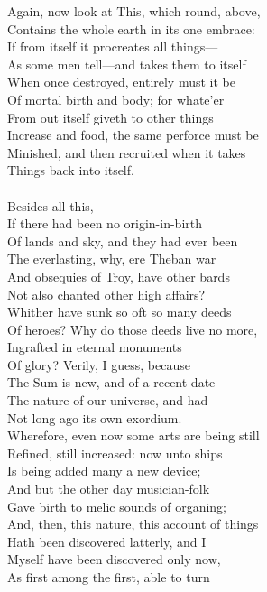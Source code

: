 Again, now look at This, which round, above,\\
Contains the whole earth in its one embrace:\\
If from itself it procreates all things—\\
As some men tell—and takes them to itself\\
When once destroyed, entirely must it be\\
Of mortal birth and body; for whate'er\\
From out itself giveth to other things\\
Increase and food, the same perforce must be\\
Minished, and then recruited when it takes\\
Things back into itself.\\
\\
Besides all this,\\
If there had been no origin-in-birth\\
Of lands and sky, and they had ever been\\
The everlasting, why, ere Theban war\\
And obsequies of Troy, have other bards\\
Not also chanted other high affairs?\\
Whither have sunk so oft so many deeds\\
Of heroes? Why do those deeds live no more,\\
Ingrafted in eternal monuments\\
Of glory? Verily, I guess, because\\
The Sum is new, and of a recent date\\
The nature of our universe, and had\\
Not long ago its own exordium.\\
Wherefore, even now some arts are being still\\
Refined, still increased: now unto ships\\
Is being added many a new device;\\
And but the other day musician-folk\\
Gave birth to melic sounds of organing;\\
And, then, this nature, this account of things\\
Hath been discovered latterly, and I\\
Myself have been discovered only now,\\
As first among the first, able to turn\\
